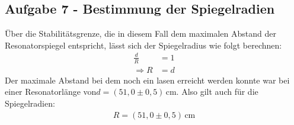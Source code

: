 \subsection{Aufgabe 7 - Bestimmung der Spiegelradien}
Über die Stabilitätsgrenze, die in diesem Fall dem maximalen Abstand der Resonatorspiegel entspricht, lässt sich der Spiegelradius wie folgt berechnen:
\begin{align}
\frac{d}{R} &= 1 \\
\Rightarrow R &= d
\end{align}
Der maximale Abstand bei dem noch ein lasen erreicht werden konnte war bei einer Resonatorlänge von$d = (51,0 \pm 0,5)\, \text{cm}$.
Also gilt auch für die Spiegelradien:
\begin{align}
R = (51,0 \pm 0,5)\, \text{cm}
\end{align}
